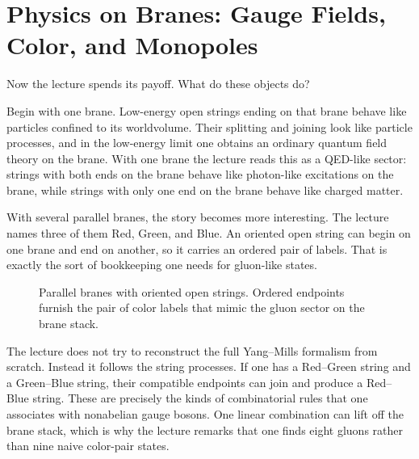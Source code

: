 \section{Physics on Branes: Gauge Fields, Color, and Monopoles}

Now the lecture spends its payoff. What do these objects do?

Begin with one brane. Low-energy open strings ending on that brane behave like particles confined to its worldvolume. Their splitting and joining look like particle processes, and in the low-energy limit one obtains an ordinary quantum field theory on the brane. With one brane the lecture reads this as a QED-like sector: strings with both ends on the brane behave like photon-like excitations on the brane, while strings with only one end on the brane behave like charged matter.

With several parallel branes, the story becomes more interesting. The lecture names three of them Red, Green, and Blue. An oriented open string can begin on one brane and end on another, so it carries an ordered pair of labels. That is exactly the sort of bookkeeping one needs for gluon-like states.

\begin{figure}[htbp]
\centering
{}
\caption{Parallel branes with oriented open strings. Ordered endpoints furnish the pair of color labels that mimic the gluon sector on the brane stack.}
\end{figure}

The lecture does not try to reconstruct the full Yang--Mills formalism from scratch. Instead it follows the string processes. If one has a Red--Green string and a Green--Blue string, their compatible endpoints can join and produce a Red--Blue string. These are precisely the kinds of combinatorial rules that one associates with nonabelian gauge bosons. One linear combination can lift off the brane stack, which is why the lecture remarks that one finds eight gluons rather than nine naive color-pair states.

